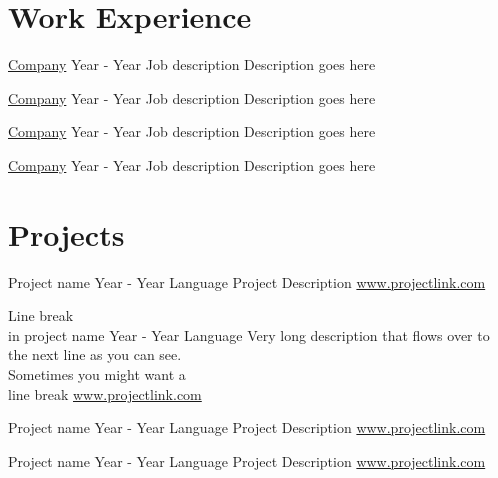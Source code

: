\documentclass{two-column-resume}
\begin{document}
\section{Work Experience}
\begin{eventlist}

\item
{\href{https://www.link.com}{Company}}%
{Year - Year}
{Job description}%
{Description goes here}%

\item
{\href{https://www.link.com}{Company}}%
{Year - Year}%
{Job description}%
{Description goes here}%

\item
{\href{https://www.link.com}{Company}}%
{Year - Year}
{Job description}%
{Description goes here}%

\item
{\href{https://www.link.com}{Company}}%
{Year - Year}
{Job description}%
{Description goes here}%

\end{eventlist}

\section{Projects}
\begin{eventlist}

\item
{Project name}%
{Year - Year}%
{Language}%
{Project Description}%
{\href{https://www.projectlink.com}{www.projectlink.com}}%

\item
{Line break\\in project name}%
{Year - Year}%
{Language}%
{Very long description that flows over to the next line as you can see.\\%
Sometimes you might want a\\%
line break}%
{\href{https://www.projectlink.com}{www.projectlink.com}}%

\item
{Project name}%
{Year - Year}%
{Language}%
{Project Description}%
{\href{https://www.projectlink.com}{www.projectlink.com}}%

\item
{Project name}%
{Year - Year}%
{Language}%
{Project Description}%
{\href{https://www.projectlink.com}{www.projectlink.com}}%

\end{eventlist}
\end{document}
